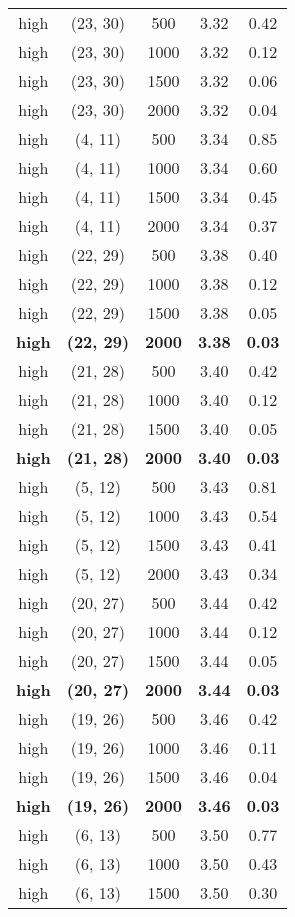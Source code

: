 \begin{tabular}{c c c c c}
high & (23, 30) &  500 & 3.32 & 0.42 \\
high & (23, 30) &  1000 & 3.32 & 0.12 \\
high & (23, 30) &  1500 & 3.32 & 0.06 \\
high & (23, 30) &  2000 & 3.32 & 0.04 \\
high & (4, 11) &  500 & 3.34 & 0.85 \\
high & (4, 11) &  1000 & 3.34 & 0.60 \\
high & (4, 11) &  1500 & 3.34 & 0.45 \\
high & (4, 11) &  2000 & 3.34 & 0.37 \\
high & (22, 29) &  500 & 3.38 & 0.40 \\
high & (22, 29) &  1000 & 3.38 & 0.12 \\
high & (22, 29) &  1500 & 3.38 & 0.05 \\
\textbf{high} & \textbf{(22, 29)} & \textbf{ 2000} & \textbf{3.38} & \textbf{0.03} \\
high & (21, 28) &  500 & 3.40 & 0.42 \\
high & (21, 28) &  1000 & 3.40 & 0.12 \\
high & (21, 28) &  1500 & 3.40 & 0.05 \\
\textbf{high} & \textbf{(21, 28)} & \textbf{ 2000} & \textbf{3.40} & \textbf{0.03} \\
high & (5, 12) &  500 & 3.43 & 0.81 \\
high & (5, 12) &  1000 & 3.43 & 0.54 \\
high & (5, 12) &  1500 & 3.43 & 0.41 \\
high & (5, 12) &  2000 & 3.43 & 0.34 \\
high & (20, 27) &  500 & 3.44 & 0.42 \\
high & (20, 27) &  1000 & 3.44 & 0.12 \\
high & (20, 27) &  1500 & 3.44 & 0.05 \\
\textbf{high} & \textbf{(20, 27)} & \textbf{ 2000} & \textbf{3.44} & \textbf{0.03} \\
high & (19, 26) &  500 & 3.46 & 0.42 \\
high & (19, 26) &  1000 & 3.46 & 0.11 \\
high & (19, 26) &  1500 & 3.46 & 0.04 \\
\textbf{high} & \textbf{(19, 26)} & \textbf{ 2000} & \textbf{3.46} & \textbf{0.03} \\
high & (6, 13) &  500 & 3.50 & 0.77 \\
high & (6, 13) &  1000 & 3.50 & 0.43 \\
high & (6, 13) &  1500 & 3.50 & 0.30 \\

\end{tabular}
